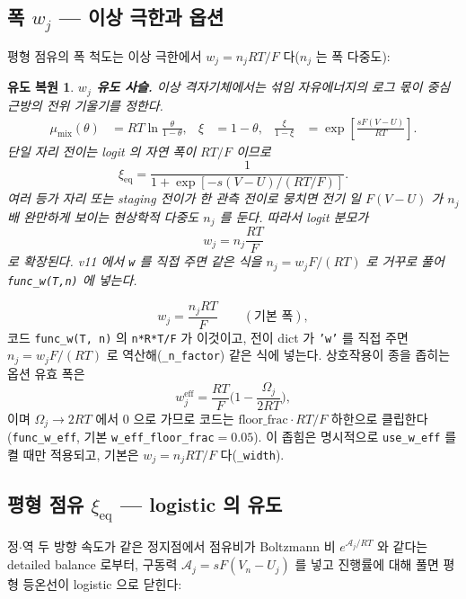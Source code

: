 \documentclass[11pt,a4paper]{article}
\newtheorem*{derivebox}{유도 복원}
\newcommand{\eff}{\mathrm{eff}}
\newcommand{\eq}{\mathrm{eq}}
\newcommand{\code}[1]{\texttt{#1}}
\begin{document}
\subsection{폭 $w_j$ — 이상 극한과 옵션}
평형 점유의 폭 척도는 이상 극한에서 $w_j=n_jRT/F$ 다($n_j$ 는 폭 다중도):

\begin{derivebox}
\textbf{$w_j$ 유도 사슬.} 이상 격자기체에서는 섞임 자유에너지의 로그 몫이 중심 근방의 전위 기울기를 정한다.
\begin{align*}
\mu_{\mathrm{mix}}(\theta)&=RT\ln\frac{\theta}{1-\theta},
& \xi&=1-\theta,
& \frac{\xi}{1-\xi}&=\exp\!\left[\frac{sF(V-U)}{RT}\right].
\end{align*}
단일 자리 전이는 logit 의 자연 폭이 $RT/F$ 이므로
\begin{equation*}
\xi_{\eq}=\frac{1}{1+\exp[-s(V-U)/(RT/F)]}.
\end{equation*}
여러 등가 자리 또는 staging 전이가 한 관측 전이로 뭉치면 전기 일 $F(V-U)$ 가 $n_j$ 배 완만하게 보이는 현상학적 다중도 $n_j$ 를 둔다. 따라서 logit 분모가
\begin{equation*}
w_j=n_j\frac{RT}{F}
\end{equation*}
로 확장된다. v11 에서 \code{w} 를 직접 주면 같은 식을 $n_j=w_jF/(RT)$ 로 거꾸로 풀어 \code{func\_w(T,n)} 에 넣는다.
\end{derivebox}

\begin{equation}
w_j=\frac{n_jRT}{F}\qquad(\text{기본 폭}),
\label{eq:wbase}
\end{equation}
코드 \code{func\_w(T, n)} 의 \code{n*R*T/F}
가 이것이고, 전이 dict 가 \code{'w'} 를 직접 주면 $n_j=w_jF/(RT)$ 로 역산해(\code{\_n\_factor}) 같은 식에 넣는다.
상호작용이 종을 좁히는 옵션 유효 폭은
\begin{equation}
w_j^\eff=\frac{RT}{F}\Big(1-\frac{\Omega_j}{2RT}\Big),
\label{eq:weff}
\end{equation}
이며 $\Omega_j\to2RT$ 에서 $0$ 으로 가므로 코드는 $\mathrm{floor\_frac}\cdot RT/F$ 하한으로 클립한다(\code{func\_w\_eff},
기본 \code{w\_eff\_floor\_frac}$=0.05$). 이 좁힘은 명시적으로 \code{use\_w\_eff} 를 켤 때만 적용되고, 기본은
$w_j=n_jRT/F$ 다(\code{\_width}).

\subsection{평형 점유 $\xi_\eq$ — logistic 의 유도}
정$\cdot$역 두 방향 속도가 같은 정지점에서 점유비가 Boltzmann 비 $e^{\mathcal A_j/RT}$ 와 같다는 detailed balance 로부터,
구동력 $\mathcal A_j=sF(V_n-U_j)$ 를 넣고 진행률에 대해 풀면 평형 등온선이 logistic 으로 닫힌다:
\end{document}
